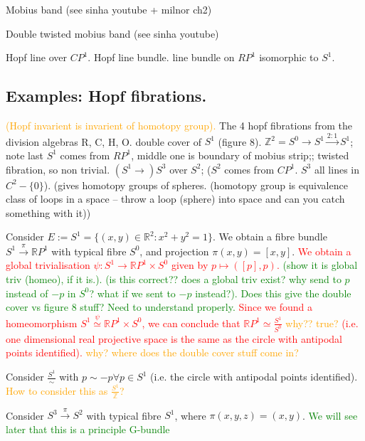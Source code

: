 \documentclass[a4paper]{article}
\theoremstyle{definition} \newtheorem*{definition}{Definition}
\theoremstyle{definition} \newtheorem*{definitions}{Definitions}
\theoremstyle{plain} \newtheorem{theorem}{Theorem}[section]
\theoremstyle{plain} \newtheorem{proposition}[theorem]{Proposition}
\theoremstyle{plain} \newtheorem{corollary}[theorem]{Corollary}
\theoremstyle{plain} \newtheorem{lemma}[theorem]{Lemma}
\theoremstyle{plain} \newtheorem{example}[theorem]{Example}
\newcommand{\checkCorrect}[1]{\textcolor{red}{#1}}
\newcommand{\understandBetter}[1]{\textcolor{orange}{#1}}
\newcommand{\question}[1]{\textcolor{orange}{#1}}
\newcommand{\finish}[1]{\textcolor{green}{#1}}
\newcommand{\realnos}{\mathbb{R}}
\begin{document}
Mobius band (see sinha youtube + milnor ch2)

Double twisted mobius band (see sinha youtube)

Hopf line over $CP^1$. 
Hopf line bundle. 
line bundle on $RP^1$ isomorphic to $S^1$. 

\subsection{Examples: Hopf fibrations.}
\understandBetter{(Hopf invarient is invarient of homotopy group).}
The 4 hopf fibrations from the division algebras R, C, H, O.
double cover of $S^1$ (figure 8). 
$\mathbb{Z}^2 = S^0 \to S^1 \xrightarrow{2:1} S^1$; note last $S^1$ comes from $RP^1$, middle one is boundary of mobius strip;; twisted fibration, so non trivial.
$(S^1\to) S^3$ over $S^2$; ($S^2$ comes from $CP^1$. $S^3$ all lines in $C^2 - \{0\}$).
(gives homotopy groups of spheres. (homotopy group is equivalence class of loops in a space -- throw a loop (sphere) into space and can you catch something with it))

 Consider $E:=S^1=\{(x,y)\in \realnos^2:x^2+y^2=1\}$. We obtain a fibre bundle $S^1\xrightarrow{\pi} \realnos P^1$ with typical fibre $S^0$, and projection $\pi(x, y)=[x, y]$. \checkCorrect{We obtain a global trivialisation $\psi:S^1\to \realnos P^1\times S^0$ given by $p\mapsto ([p], p)$.} \finish{(show it is global triv (homeo), if it is.). (is this correct?? does a global triv exist? why send to $p$ instead of $-p$ in $S^0$? what if we sent to $-p$ instead?). Does this give the double cover vs figure 8 stuff? Need to understand properly.} \checkCorrect{Since we found a homeomorphism $S^1\overset{\psi}{\simeq} \realnos P^1\times S^0$, we can conclude that $\realnos P^1 \simeq \frac{S^1}{S^0}$ \question{why?? true?} (i.e. one dimensional real projective space is the same as the circle with antipodal points identified). \question{why?}} \question{where does the double cover stuff come in?}

Consider $\frac{S^1}{\sim}$ with $p\sim -p \forall p\in S^1$ (i.e. the circle with antipodal points identified). \question{How to consider this as $\frac{S^1}{\mathbb{Z}}$?}


Consider $S^3\xrightarrow{\pi} S^2$ with typical fibre $S^1$, where $\pi(x, y, z)=(x, y)$. \finish{We will see later that this is a principle G-bundle}
\end{document}
